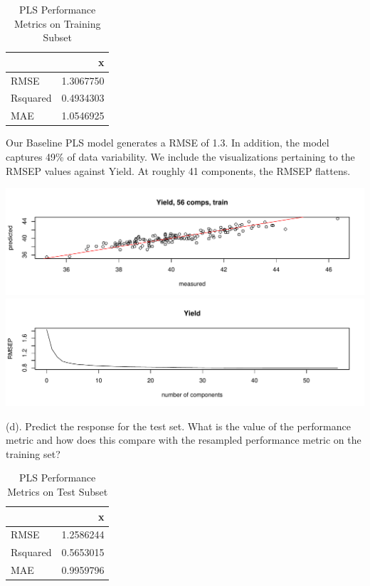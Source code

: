 \documentclass[]{report}
\begin{document}
\begin{table}[H]

\caption{\label{tab:kj-6.3c}PLS Performance Metrics on Training Subset}
\centering
\begin{tabular}{l|r}
\hline
  & x\\
\hline
\rowcolor{gray!6}  RMSE & 1.3067750\\
\hline
Rsquared & 0.4934303\\
\hline
\rowcolor{gray!6}  MAE & 1.0546925\\
\hline
\end{tabular}
\end{table}

Our Baseline PLS model generates a RMSE of 1.3. In addition, the model
captures 49\% of data variability. We include the visualizations
pertaining to the RMSEP values against Yield. At roughly 41 components,
the RMSEP flattens.

\includegraphics{Homework-Two_files/figure-latex/kj-6.3c2-1.pdf}
\includegraphics{Homework-Two_files/figure-latex/kj-6.3c2-2.pdf}

\begin{subquestion}{(d).} Predict the response for the test set. What is the value of the performance metric and how does this compare with the resampled performance metric on the training set? 
\end{subquestion}

\begin{table}[H]

\caption{\label{tab:kj-6.3d}PLS Performance Metrics on Test Subset}
\centering
\begin{tabular}{l|r}
\hline
  & x\\
\hline
\rowcolor{gray!6}  RMSE & 1.2586244\\
\hline
Rsquared & 0.5653015\\
\hline
\rowcolor{gray!6}  MAE & 0.9959796\\
\hline
\end{tabular}
\end{table}
\end{document}
